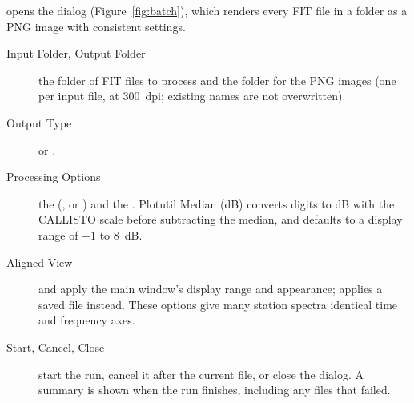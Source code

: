  opens the  dialog (Figure~\ref{fig:batch}), which renders every FIT file in a folder as a
PNG image with consistent settings.


\begin{description}
  \item[Input Folder, Output Folder] the folder of FIT files to process and the folder for
    the PNG images (one per input file, at 300~dpi; existing names are not overwritten).
  \item[Output Type]  or .
  \item[Processing Options] the  (,  or
    ) and the . Plotutil Median (dB) converts digits
    to dB with the CALLISTO scale before subtracting the median, and defaults to a display
    range of \(-1\) to 8~dB.
  \item[Aligned View]  and 
    apply the main window's display range and appearance;  applies
    a saved  file instead. These options give many station spectra
    identical time and frequency axes.
  \item[Start, Cancel, Close] start the run, cancel it after the current file, or close the
    dialog. A summary is shown when the run finishes, including any files that failed.
\end{description}
